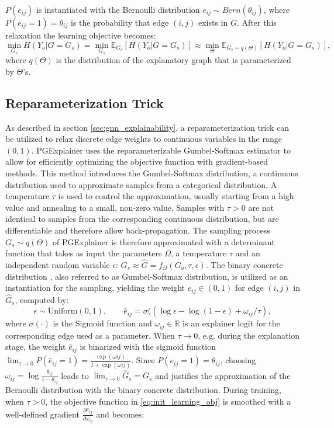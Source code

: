  $P(e_{ij})$ is instantiated with the Bernoulli distribution $e_{ij} \sim Bern(\theta_{ij})$, where $P(e_{ij} = 1) = \theta_{ij}$ is the probability that edge $(i,j)$ exists in $G$.
After this relaxation the learning objective becomes:
\begin{equation}
    \label{eq:init_learning_obj}
    \min_{G_s}H(Y_o|G = G_s) = \min_{G_s} \mathbb{E}_{G_s}[H(Y_o|G = G_s)] \approx \min_{\Theta} \mathbb{E}_{G_s \sim q(\Theta)}[H(Y_o|G = G_s)],
\end{equation}
where $q(\Theta)$ is the distribution of the explanatory graph that is parameterized by $\Theta$'s.

\subsection{Reparameterization Trick}
\label{sec:Reparameterization_Trick}
As described in section \ref{sec:gnn_explainability}, a reparameterization trick can be utilized to relax discrete edge weights to continuous variables in the range $(0,1)$. PGExplainer uses the reparameterizable Gumbel-Softmax estimator \cite{jang2016categorical} to allow for efficiently optimizing the objective function with gradient-based methods. This method introduces the Gumbel-Softmax distribution, a continuous distribution used to approximate samples from a categorical distribution. A temperature $\tau$ is used to control the approximation, usually starting from a high value and annealing to a small, non-zero value. Samples with $\tau > 0$ are not identical to samples from the corresponding continuous distribution, but are differentiable and therefore allow back-propagation. The sampling process $G_s \sim q(\Theta)$ of PGExplainer is therefore approximated with a determinant function that takes as input the parameters $\Omega$, a temperature $\tau$ and an independent random variable $\epsilon$: $G_s \approx \hat{G}=f_\Omega(G_o,\tau,\epsilon)$. The binary concrete distribution \cite{maddison2016concrete}, also referred to as Gumbel-Softmax distribution, is utilized as an instantiation for the sampling, yielding the weight $\hat{e}_{ij} \in (0,1)$ for edge $(i,j)$ in $\hat{G}_s$, computed by:
\begin{equation}
    \label{eq:reparam_trick}
    \epsilon \sim \text{Uniform}(0,1), \qquad \hat{e}_{ij}=\sigma((\log \epsilon - \log(1-\epsilon)+\omega_{ij}/\tau),
\end{equation}
where $\sigma(\cdot)$ is the Sigmoid function and $\omega_{ij} \in \mathbb{R}$ is an explainer logit for the corresponding edge used as a parameter. When $\tau \rightarrow 0$, e.g. during the explanation stage, the weight $\hat{e}_{ij}$ is binarized with the sigmoid function $\lim_{\tau\rightarrow 0}P(\hat{e}_{ij} = 1) = \frac{\exp (\omega{ij})}{1+\exp (\omega{ij})}$. Since $P(e_{ij} = 1) = \theta_{ij}$, choosing $\omega_{ij} = \log\frac{\theta_{ij}}{1-\theta_{ij}}$ leads to $\lim_{\tau\rightarrow 0}\hat{G}_s = G_s$ and justifies the approximation of the Bernoulli distribution with the binary concrete distribution. During training, when $\tau > 0$, the objective function in \eqref{eq:init_learning_obj} is smoothed with a well-defined gradient $\frac{\partial\hat{e}_{ij}}{\partial\omega_{ij}}$ and becomes:
